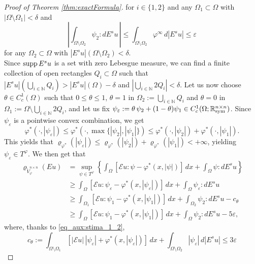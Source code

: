 \documentclass[a4paper,11pt,oneside,notitlepage]{article}
\numberwithin{equation}{section}
\def\R{\mathbb{R}}
\def\N{\mathbb{N}}
\def\sym{{\rm sym}}
\def\supp{{\rm supp}}
\newcommand{\e}{\varepsilon}
\newcommand{\vphi}{\varphi}
\newcommand{\vrho}{\varrho}
\newcommand{\E}{\mathcal{E}}
\begin{document}
\begin{proof}[Proof of Theorem \ref{thm:exactFormula}]
    for $i \in \{1,2\}$ and any $\Omega_1 \subset \Omega$ with $|\Omega \setminus \Omega_1|< \delta$ and 
    \begin{equation*}
        \left|\int_{\Omega \setminus \Omega_2} \psi_2 : dE^su \, \right| \le \int_{\Omega \setminus \Omega_2} \vphi^\infty \, d|E^su| \le \e
    \end{equation*}
    for any $\Omega_2 \subset \Omega$ with $|E^su|(\Omega \setminus \Omega_2) < \delta$.
    \\
    Since $\supp \, E^su$ is a set with zero Lebesgue measure, we can find a finite collection of open rectangles $Q_i \subset \Omega$ such that $|E^su|(\bigcup_{i \in \N} Q_i) > |E^su|(\Omega) - \delta$ and $|\bigcup_{i \in \N} 2Q_i| < \delta$. Let us now choose $\theta \in C^1_c(\Omega)$ such that $0 \le \theta \le 1$, $\theta=1$ in $\Omega_2 := \bigcup_{i \in \N} Q_i$ and $\theta = 0$ in $\Omega_1 := \Omega \setminus \bigcup_{i \in \N} 2Q_i$, and let us fix $\psi_\e := \theta \, \psi_2 + (1 - \theta) \psi_1 \in C^1_c(\Omega; \R^{n\times n}_\sym)$. Since $\psi_\e$ is a pointwise convex combination, we get
    \begin{equation*}
        \vphi^*(\cdot, |\psi_\e|) \le \vphi^*(\cdot, \max\{|\psi_2|, |\psi_1|\}) \le \vphi^*(\cdot, |\psi_2|) + \vphi^*(\cdot, |\psi_1|).
    \end{equation*}
    This yields that $\vrho_{\vphi^*}(|\psi_\e|) \le \vrho_{\vphi^*}(|\psi_2|) + \vrho_{\vphi^*}(|\psi_1|) < +\infty$, yielding $\psi_\e \in T^\vphi$. We then get that
    \begin{equation*}
    \begin{aligned}
        \vrho_{\widetilde{V}^{n \times n}_\vphi}(Eu)
        &= \sup_{\psi \in T^\vphi} \left\{\int_\Omega [\E u : \psi - \vphi^*(x, |\psi|)] \, dx + \int_\Omega \psi : dE^su \right\} \\
        &\ge \int_\Omega [\E u : \psi_\e - \vphi^*(x, |\psi_\e|)] \, dx + \int_\Omega \psi_\e : dE^su \\
        &\ge \int_{\Omega_1} [\E u : \psi_1 - \vphi^*(x, |\psi_1|)] \, dx + \int_{\Omega_2} \psi_2 : dE^su - c_\theta \\
        &\ge \int_\Omega [\E u : \psi_1 - \vphi^*(x, |\psi_1|)] \, dx + \int_\Omega \psi_2 : dE^su - 5\e,
    \end{aligned}
    \end{equation*}
    where, thanks to \eqref{eq_aux:stima_1_2},
    \begin{equation*}
        c_\theta := \int_{\Omega \setminus \Omega_1} [|\E u| \, |\psi_\e| + \vphi^*(x, |\psi_\e|)] \, dx + \int_{\Omega \setminus\Omega_2} |\psi_\e|\,  d|E^su| \le 3\e

\end{equation*}
\end{proof}
\end{document}
